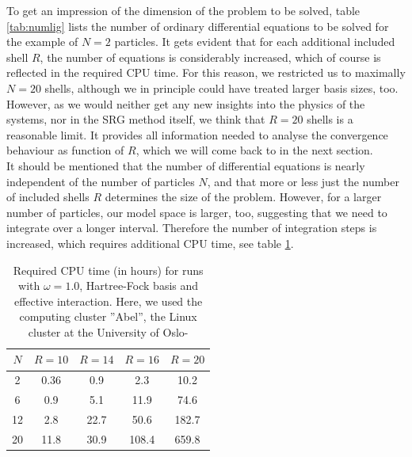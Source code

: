 To get an impression of the dimension of the problem to be solved, table \ref{tab:numlig} lists the number of ordinary differential equations to be solved for the example of $N=2$ particles. It gets evident that for each additional included shell $R$, the number of equations is considerably increased, which of course is reflected in the required CPU time. For this reason, we restricted us to maximally $N=20$ shells, although we in principle could have treated larger basis sizes, too. However, as we would neither get any new insights into the physics of the systems, nor in the SRG method itself, we think that $R=20$ shells is a reasonable limit. It provides all information needed to analyse the convergence behaviour as function of $R$, which we will come back to in the next section.\\
It should be mentioned that the number of differential equations is nearly independent of the number of particles $N$, and that more or less just the number of included shells $R$ determines the size of the problem. However, for a larger number of particles, our model space is larger, too, suggesting that we need to integrate over a longer interval. Therefore the number of integration steps is increased, which requires additional CPU time, see table \ref{tab:cputime}.

\begin{table}
\begin{center}
\begin{tabular}{ccccc}
\hline\hline
$N$ & $R=10$ & $R=14$ & $R=16$ & $R=20$ \\
\hline
2 & 0.36 &0.9 &2.3 & 10.2 \\
6 &0.9 &5.1 & 11.9& 74.6 \\
12 &2.8 &22.7 &50.6 &182.7 \\
20 &11.8 & 30.9&108.4 & 659.8\\
\hline\hline
\end{tabular}
\end{center}
\caption{Required CPU time (in hours) for runs with $\omega=1.0$, Hartree-Fock basis and effective interaction. Here, we used the computing cluster ''Abel'', the Linux cluster at the University of Oslo-}
\label{tab:cputime}
\end{table}

